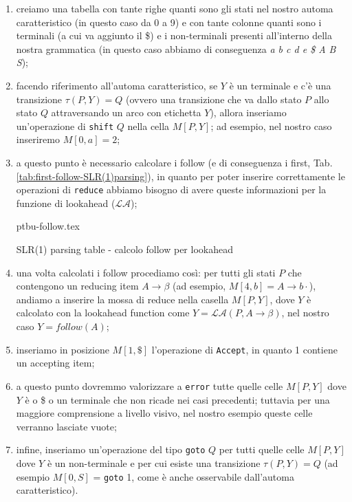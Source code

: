\documentclass[class=book, crop=false, oneside, 12pt]{standalone}
\begin{document}
\begin{enumerate}
    \item creiamo una tabella con tante righe quanti sono gli stati nel nostro automa caratteristico (in questo caso da 0 a 9) e con tante colonne quanti sono i terminali (a cui va aggiunto il \$) e i non-terminali presenti all'interno della nostra grammatica (in questo caso abbiamo di conseguenza \emph{a b c d e \$ A B S});
    \item facendo riferimento all'automa caratteristico, se \(Y\) è un terminale e c'è una transizione \(\tau (P, Y) = Q\) (ovvero una transizione che va dallo stato \(P\) allo stato \(Q\) attraversando un arco con etichetta \(Y\)), allora inseriamo un'operazione di \texttt{shift} \(Q\) nella cella \(M[P, Y]\); ad esempio, nel nostro caso inseriremo \(M[0, a] = 2\);
    \item a questo punto è necessario calcolare i follow (e di conseguenza i first, Tab.\ref{tab:first-follow-SLR(1)parsing}), in quanto per poter inserire correttamente le operazioni di \texttt{reduce} abbiamo bisogno di avere queste informazioni per la funzione di lookahead (\(\mathcal{LA}\));
    \begin{table}[H]
        \centering
        {ptbu-follow.tex}
        \caption{SLR(1) parsing table - calcolo follow per lookahead}
        \label{tab:first-follow-SLR(1)parsing}
    \end{table}
    \item una volta calcolati i follow procediamo così: per tutti gli stati \(P\) che contengono un reducing item \(A \to \beta\) (ad esempio, \(M[4, b] = A \rightarrow b\cdot\)), andiamo a inserire la mossa di reduce nella casella \(M[P, Y]\), dove \(Y\) è calcolato con la lookahead function come \(Y = \mathcal{LA}(P, A \to \beta)\), nel nostro caso \(Y = follow(A)\); 
    \item inseriamo in posizione \(M[1, \$]\) l'operazione di \texttt{Accept}, in quanto 1 contiene un accepting item;
    \item a questo punto dovremmo valorizzare a \texttt{error} tutte quelle celle \(M[P, Y]\) dove \(Y\) è o \$ o un terminale che non ricade nei casi precedenti; tuttavia per una maggiore comprensione a livello visivo, nel nostro esempio queste celle verranno lasciate vuote;
    \item infine, inseriamo un'operazione del tipo \texttt{goto} \(Q\) per tutti quelle celle \(M[P, Y]\) dove \(Y\) è un non-terminale e per cui esiste una transizione \(\tau(P, Y) = Q\) (ad esempio \(M[0, S]\) = \texttt{goto} 1, come è anche osservabile dall'automa caratteristico).
\end{enumerate}
\end{document}
